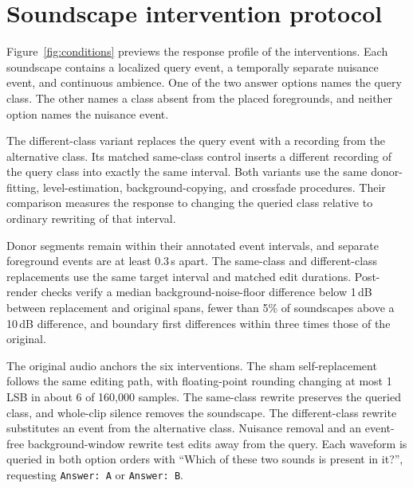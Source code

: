 \section{Soundscape intervention protocol}
\label{sec:protocol}

Figure~\ref{fig:conditions} previews the response profile of the interventions.
Each soundscape contains a localized query event, a temporally separate
nuisance event, and continuous ambience. One of the two answer options names
the query class. The other names a class absent from the placed foregrounds,
and neither option names the nuisance event.

The different-class variant replaces the query event with a recording from the
alternative class. Its matched same-class control inserts a different recording
of the query class into exactly the same interval. Both variants use the same
donor-fitting, level-estimation, background-copying, and crossfade procedures.
Their comparison measures the response to changing the queried class relative
to ordinary rewriting of that interval.

Donor segments remain within their annotated event intervals, and separate
foreground events are at least 0.3\,s apart. The same-class and different-class
replacements use the same target interval and matched edit durations. Post-render
checks verify a median background-noise-floor difference below 1\,dB between
replacement and original spans, fewer than 5\% of soundscapes above a 10\,dB
difference, and boundary first differences within three times those of the
original.

The original audio anchors the six interventions. The sham self-replacement
follows the same editing path, with floating-point rounding changing at most
1 LSB in about 6 of 160,000 samples. The same-class rewrite preserves the
queried class, and whole-clip silence removes the soundscape. The different-class
rewrite substitutes an event from the alternative class. Nuisance removal and
an event-free background-window rewrite test edits away from the query.
Each waveform is queried in both option orders with
``Which of these two sounds is present in it?'', requesting
\texttt{Answer: A} or \texttt{Answer: B}.
